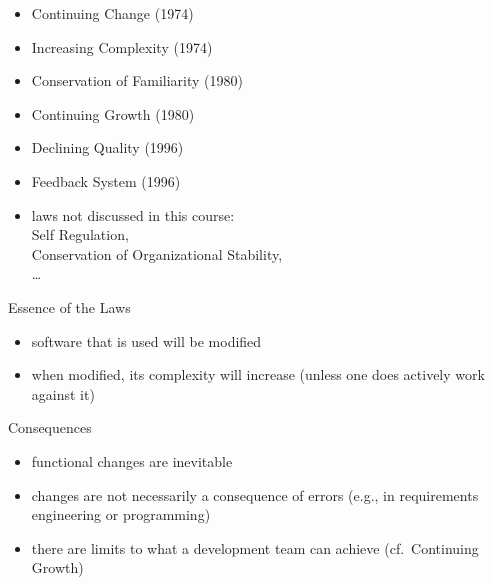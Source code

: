 \begin{frame}{\insertsubsection{} \mytitlesource{\lehmanslaws, \sommerville}}
	\begin{fancycolumns}
		\begin{definition}{\insertsubsection}
			\begin{itemize}
				\item Continuing Change (1974)
				\item Increasing Complexity (1974)
				\item Conservation of Familiarity (1980)
				\item Continuing Growth (1980)
				\item Declining Quality (1996)
				\item Feedback System (1996)
				\item laws not discussed in this course:\\Self Regulation,\\Conservation of Organizational Stability,\\\ldots
			\end{itemize}
		\end{definition}
		\nextcolumn
		\begin{note}{Essence of the Laws}
			\begin{itemize}
				\item software that is used will be modified
				\item when modified, its complexity will increase (unless one does actively work against it)
			\end{itemize}
		\end{note}
		\begin{example}{Consequences}
			\begin{itemize}
				\item functional changes are inevitable
				\item changes are not necessarily a consequence of errors (e.g., in requirements engineering or programming)
				\item there are limits to what a development team can achieve (cf.\ Continuing Growth)
			\end{itemize}
		\end{example}
	\end{fancycolumns}
\end{frame}





